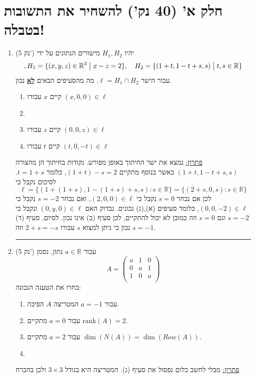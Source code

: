 \documentclass[12pt, a4paper]{article}
\newcommand{\rr}{\mathbb{R}}
\newcommand{\points}[1]{(#1 נק') }
\begin{document}
\section*{
חלק א' 
(40 נק')
להשחיר את התשובות בטבלה!}
\begin{enumerate}
\item\points{5}
יהיו
$H_1,H_2$
מישורים הנתונים על ידי 
$$,H_1=\{
(x,y,z)\in\rr^3 \bigm| x-z=2\},\quad H_2=\{
(1+t, 1-t+s, s)
\bigm| t,s\in\rr\}$$
עבור
הישר
$\ell= H_1\cap H_2$.
מה מהסעיפים הבאים \underline{\textbf{לא}} נכון.
\begin{enumerate}
\item
קיים
$x$
עבורו
$(x,0,0)\in \ell$
\item
{}
\item
קיים
$z$
עבורו
$(0,0,z)\in \ell$
\item
קיים
$t$
עבורו
$(t,0,-t)\in \ell$
\end{enumerate}

\underline{פתרון:}
נמצא את ישר החיתוך באופן מפורש. נקודות בחיתוך הן מהצורה
$(1+t,1-t+s,s)$
כאשר בנוסף מתקיים
$(1+t)-s=2$,
כלומר
$t=1+s$.
לסיכום נקבל כי
$$\ell=\{ (1+(1+s),1-(1+s)+s,s):s\in\rr\}=\{(2+s,0,s)
:s\in\rr\}$$
לכן אם נבחר
$s=0$
נקבל כי
$(2,0,0)\in\ell$,
ואם נבחר
$s=-2$
נקבל כי
$(0,0,-2)\in\ell$,
כלומר סעיפים (א),(ג) נכונים. נבדוק האם
$(0,y,0)\in\ell$
ונקבל כי
$s=-2$
וגם
$s=0$
וזה כמובן לא יכול להתקיים, לכן סעיף (ב) אינו נכון. לסיום, סעיף (ד) נכון כי ניתן למצוא
$s$
עבורו
$2+s=-s$
וזה 
$s=-1$.

\noindent\rule{\textwidth-30pt}{0.4pt}


\item\points{5}
עבור
$a\in\rr$
נתון, נסמן
$$A=\begin{pmatrix}
a&1&0\\
0&a&1\\
1&0&a\\
\end{pmatrix}$$
בחרו את הטענה הנכונה:
\begin{enumerate}
\item
עבור
$a=-1$
המטריצה
$A$
הפיכה.
\item
עבור
$a=0$
מתקיים
$\mathrm{rank}(A)=2$.
\item
עבור
$a=2$
מתקיים
$\dim(N(A))=\dim(Row(A))$.
\item
{}
\end{enumerate}

\underline{פתרון:}
מבלי לחשב כלום נפסול את סעיף (ג). המטריצה היא בגודל
$3\times3$
ולכן בהכרח


\end{enumerate}
\end{document}
